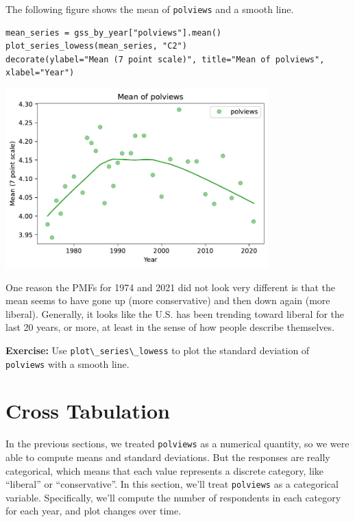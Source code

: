 The following figure shows the mean of
\passthrough{\lstinline!polviews!} and a smooth line.

\begin{lstlisting}[]
mean_series = gss_by_year["polviews"].mean()
plot_series_lowess(mean_series, "C2")
decorate(ylabel="Mean (7 point scale)", title="Mean of polviews", xlabel="Year")
\end{lstlisting}

\begin{center}
\includegraphics[width=4in]{chapters/02_polviews_soln_files/02_polviews_soln_59_0.pdf}
\end{center}

One reason the PMFs for 1974 and 2021 did not look very different is
that the mean seems to have gone up (more conservative) and then down
again (more liberal). Generally, it looks like the U.S. has been
trending toward liberal for the last 20 years, or more, at least in the
sense of how people describe themselves.

\textbf{Exercise:} Use \passthrough{\lstinline!plot\_series\_lowess!} to
plot the standard deviation of \passthrough{\lstinline!polviews!} with a
smooth line.

\hypertarget{cross-tabulation}{%
\section{Cross Tabulation}\label{cross-tabulation}}

In the previous sections, we treated \passthrough{\lstinline!polviews!}
as a numerical quantity, so we were able to compute means and standard
deviations. But the responses are really categorical, which means that
each value represents a discrete category, like ``liberal'' or
``conservative''. In this section, we'll treat
\passthrough{\lstinline!polviews!} as a categorical variable.
Specifically, we'll compute the number of respondents in each category
for each year, and plot changes over time.

